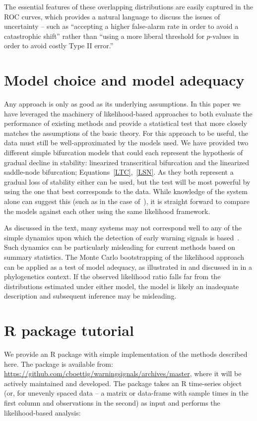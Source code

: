 \documentclass[authoryear, preprint,review,12pt]{elsarticle}
\begin{document}
The essential features of these overlapping distributions are easily captured in the ROC curves, which provides a natural language to discuss the issues of uncertainty -- such as ``accepting a higher false-alarm rate in order to avoid a catastrophic shift'' rather than ``using a more liberal threshold for $p$-values in order to avoid costly Type II error.''  



\section{Model choice and model adequacy}\label{modelchoice}
Any approach is only as good as its underlying assumptions.  In this paper we have leveraged the machinery of likelihood-based approaches to both evaluate the performance of existing methods and provide a statistical test that more closely matches the assumptions of the basic theory.  For this approach to be useful, the data must still be well-approximated by the models used.  We have provided two different simple bifurcation models that could each represent the hypothesis of gradual decline in stability: linearized transcritical bifurcation and the linearized saddle-node bifurcation; Equations~\eqref{LTC},~\eqref{LSN}.  As they both represent a gradual loss of stability either can be used, but the test will be most powerful by using the one that best corresponds to the data.  While knowledge of the system alone can suggest this (such as in the case of~\citet{Drake2010}), it is straight forward to compare the models against each other using the same likelihood framework.  

As discussed in the text, many systems may not correspond well to any of the simple dynamics upon which the detection of early warning signals is based~\citep{Hastings2010}.  Such dynamics can be particularly misleading for current methods based on summary statistics.  The Monte Carlo bootstrapping of the likelihood approach can be applied as a test of model adequacy, as illustrated in \citet{Goldman1993} and discussed in \citet{Sullivan2005b} in a phylogenetics context. If the observed likelihood ratio falls far from the distributions estimated under either model, the model is likely an inadequate description and subsequent inference may be misleading.  


\section{R package tutorial}\label{R}
We provide an R package with simple implementation of the methods described here.  The package is available from: \href{https://github.com/cboettig/warningsignals/archives/master}{https://github.com/cboettig/warningsignals/archives/master}, where it will be actively maintained and developed.  The package takes an R time-series object (or, for unevenly spaced data -- a matrix or data-frame with sample times in the first column and observations in the second) as input and performs the likelihood-based analysis:
\end{document}
